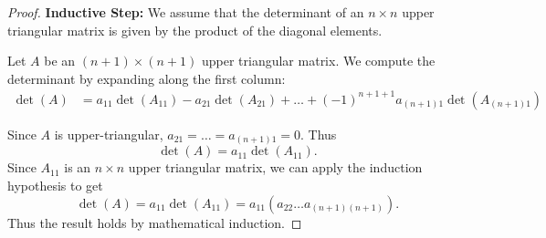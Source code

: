 \documentclass[12pt,letterpaper]{article}
\begin{document}
\begin{enumerate}
\begin{proof}
  {\bf Inductive Step:} We assume that the determinant of an $n\times n$ upper triangular matrix is given by the product of the diagonal elements.
  
  Let $A$ be an $(n+1)\times(n+1)$ upper triangular matrix. We compute the determinant by expanding along the first column:
  \begin{align*}
  \det(A)&= a_{11} \det(A_{11}) -a_{21}\det(A_{21})+\dots+(-1)^{n+1+1}a_{(n+1)1}\det(A_{(n+1)1})
  \end{align*}

Since $A$ is upper-triangular, $a_{21}=\dots=a_{(n+1)1}=0$. Thus
$$\det(A)= a_{11} \det(A_{11}).$$ Since $A_11$ is an $n\times n$ upper triangular matrix, we can apply the induction hypothesis to get $$\det(A)= a_{11} \det(A_{11})=a_{11} (a_{22}\dots a_{(n+1)(n+1)}).$$ Thus the result holds by mathematical induction.
  \end{proof}
  
\end{enumerate}
\end{document}

